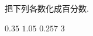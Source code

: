 把下列各数化成百分数.
\begin{subquestions}
    \subquestion $0.35$
    \subquestion $1.05$
    \subquestion $0.257$
    \subquestion $3$


\end{subquestions}